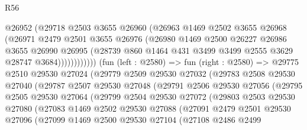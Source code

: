 \begin{lexlean}{R56}
\begin{coremodule}
                      @26952
                      (@29718
                        @2503
                        @3655
                        @26960
                        (@26963
                          @1469
                          @2502
                          @3655
                          @26968
                          (@26971
                            @2479
                            @2501
                            @3655
                            @26976
                            (@26980
                              @1469
                              @2500
                              @26227
                              @26986
                              @3655
                              @26990
                              @26995
                              (@28739
                                @860
                                @1464
                                @431
                                @3499
                                @3499
                                @2555
                                @3629
                                @28747
                                @3684))))))))))))
        (fun (left : @2580) =>
        fun (right : @2580) =>
        @29775
          @2510
          @29530
          @27024
          (@29779
            @2509
            @29530
            @27032
            (@29783
              @2508
              @29530
              @27040
              (@29787
                @2507
                @29530
                @27048
                (@29791
                  @2506
                  @29530
                  @27056
                  (@29795
                    @2505
                    @29530
                    @27064
                    (@29799
                      @2504
                      @29530
                      @27072
                      (@29803
                        @2503
                        @29530
                        @27080
                        (@27083
                          @1469
                          @2502
                          @29530
                          @27088
                          (@27091
                            @2479
                            @2501
                            @29530
                            @27096
                            (@27099
                              @1469
                              @2500
                              @29530
                              @27104
                              (@27108
                                @2486
                                @2499

\end{coremodule}
\end{lexlean}
